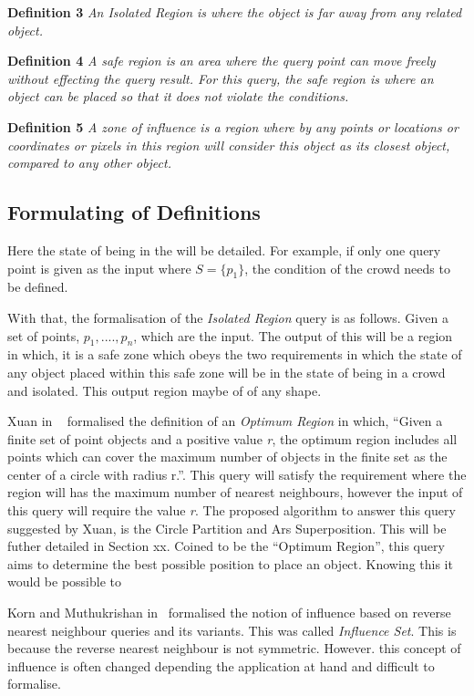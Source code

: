 \documentclass[a4paper,11pt]{article}
\begin{document}
\textbf{Definition 3} \textit{An Isolated Region is where the object is far away from any related object.}

\textbf{Definition 4} \textit{A safe region is an area where the query point can move freely without effecting the query result. For this query, the safe region is where an object can be placed so that it does not violate the conditions.}

\textbf{Definition 5} \textit{A zone of influence is a region where by any points or locations or coordinates or pixels in this region will consider this object as its closest object, compared to any other object.}

\subsection{Formulating of Definitions}

Here the state of being in the  will be detailed. For example, if only one query point is given as the input where $S= \{ p_1\}$, the condition of the crowd needs to be defined. 

With that, the formalisation of the \textit{Isolated Region} query is as follows. Given a set of points, $p_1,....,p_n$, which are the input. The output of this will be a region in which, it is a safe zone which obeys the two requirements in which the state of any object placed within this safe zone will be in the state of being in a crowd and isolated. This output region maybe of of any shape.

Xuan in ~\cite{Xuan2012} formalised the definition of an \textit{Optimum Region} in which, ``Given a finite set of point objects and a positive value \textit{r}, the optimum region includes all points which can cover the maximum number of objects in the finite set as the center of a circle with radius r.''. This query will satisfy the requirement where the region will has the maximum number of nearest neighbours, however the input of this query will require the value \textit{r}. The proposed algorithm to answer this query suggested by Xuan, is the Circle Partition and Ars Superposition. This will be futher detailed in Section xx. Coined to be the ``Optimum Region'', this query aims to determine the best possible position to place an object. Knowing this it would be possible to 

Korn and Muthukrishan in~\cite{korn2000influence} formalised the notion of influence based on reverse nearest neighbour queries and its variants. This was called \textit{Influence Set}. This is because the reverse nearest neighbour is not symmetric. However. this concept of influence is often changed depending the application at hand and difficult to formalise. 
\end{document}
